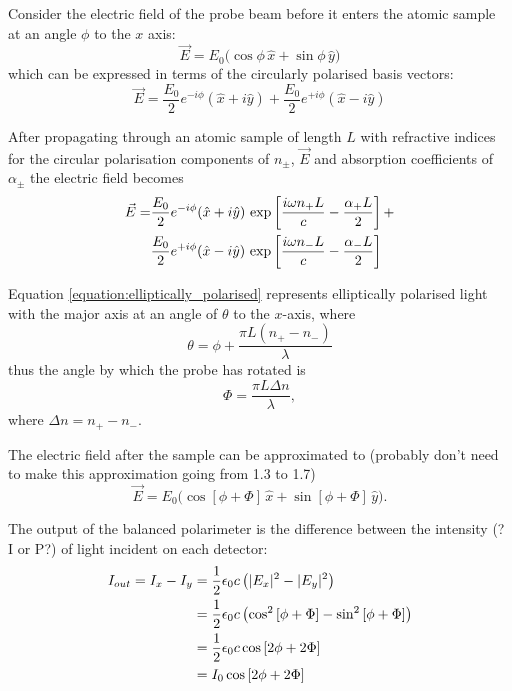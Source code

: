 Consider the electric field of the probe beam before it enters the atomic sample at an angle $\phi$ to the $x$ axis:
\begin{equation}
\vec{E}=E_0\big(\cos{\phi}\,\hat{x}+\sin{\phi}\,\hat{y}\big)
\end{equation}
which can be expressed in terms of the circularly polarised basis vectors:
\begin{equation}
\vec{E} = \frac{E_0}{2}e^{-i\phi}(\hat{x}+i\hat{y}) + \frac{E_0}{2}e^{+i\phi}(\hat{x}-i\hat{y})
\end{equation}

After propagating through an atomic sample of length $L$ with refractive indices for the circular polarisation components of $n_\pm$, $\vec{E}$ and absorption coefficients of $\alpha_\pm$ the electric field becomes
\begin{align}
\vec{E} = &\frac{E_0}{2}e^{-i\phi}(\hat{x}+i\hat{y})\,\exp\left[\frac{i\omega n_+ L}{c} - \frac{\alpha_+ L}{2}\right] +\notag\\
&\frac{E_0}{2}e^{+i\phi}(\hat{x}-i\hat{y})\,\exp\left[\frac{i\omega n_- L}{c} - \frac{\alpha_- L}{2}\right]\label{equation:elliptically_polarised}
\end{align}

Equation \ref{equation:elliptically_polarised} represents elliptically polarised light with the major axis at an angle of $\theta$ to the $x$-axis, where
\begin{equation}
\theta = \phi + \frac{\pi L (n_+ - n_-)}{\lambda}
\end{equation}
thus the angle by which the probe has rotated is
\begin{equation}
\Phi = \frac{\pi L \Delta n}{\lambda},
\end{equation}
where $\Delta n = n_+ - n_-$.

The electric field after the sample can be approximated to {\color{red}(probably don't need to make this approximation going from 1.3 to 1.7)}
\begin{equation}
\vec{E} = E_0\big(\cos\left[\phi+\Phi\right]\,\hat{x}+\sin\left[\phi+\Phi\right]\,\hat{y}\big).
\end{equation}

The output of the balanced polarimeter is the difference between the intensity {\color{red}(? I or P?)} of light incident on each detector:
\begin{align}
I_{out} = I_x - I_y &= \frac{1}{2}\epsilon_0 c \left(|E_x|^2 - |E_y|^2\right)\notag\\
&= \frac{1}{2}\epsilon_0 c \left(\cos^2\left[\phi+\Phi\right] - \sin^2\left[\phi+\Phi\right]\right)\notag\\
&= \frac{1}{2}\epsilon_0 c \cos\left[2\phi+2\Phi\right]\notag\\
&= I_0 \cos\left[2\phi+2\Phi\right]
\end{align}


